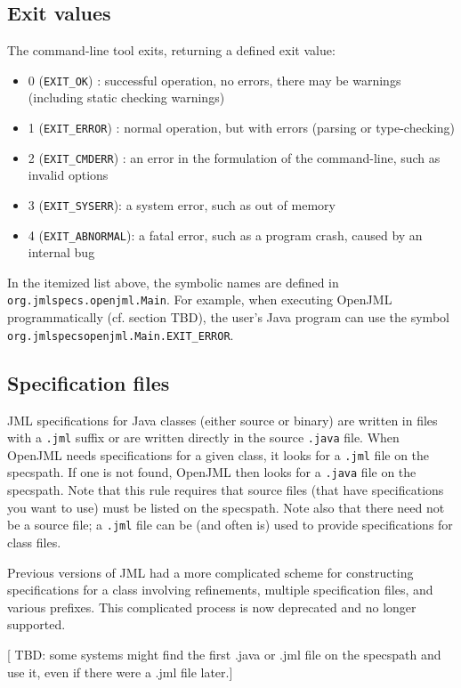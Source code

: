 \documentclass{report}%
\begin{document}
\subsection{Exit values}
The command-line tool exits, returning a defined exit value:
\begin{itemize}
\item 0 ({\tt EXIT\_OK}) : successful operation, no errors, there may be warnings (including static checking warnings)
\item 1 ({\tt EXIT\_ERROR}) : normal operation, but with errors (parsing or type-checking)
\item 2 ({\tt EXIT\_CMDERR}) : an error in the formulation of the command-line, such as invalid options
\item 3 ({\tt EXIT\_SYSERR}): a system error, such as out of memory
\item 4 ({\tt EXIT\_ABNORMAL}): a fatal error, such as a program crash, caused by an internal bug
\end{itemize}
In the itemized list above, the symbolic names are defined in {\tt org.jmlspecs.openjml.Main}. For example, when executing OpenJML programmatically (cf. section TBD), the user's Java program can use the 
symbol {\tt org.jmlspecsopenjml.Main.EXIT\_ERROR}.

\subsection{Specification files}
\label{SpecFiles}

JML specifications for Java classes (either source or binary) are written in files with a {\tt .jml} suffix or are written directly in the source {\tt .java} file.
When OpenJML needs specifications for a given class, it looks for a {\tt .jml} file on the specspath. If one is not found, OpenJML then looks for a {\tt .java}
file on the specspath. Note that this rule requires that source files (that have specifications you want to use) must be listed on the specspath. Note also that there 
need not be a source file; a {\tt .jml} file can be (and often is) used to provide specifications for class files.

Previous versions of JML had a more complicated scheme for constructing specifications for a class involving refinements, multiple specification files, and various prefixes. This complicated process is now deprecated and no longer supported.

[ TBD: some systems might find the first .java or .jml file on the specspath and use it, even if there were a .jml file later.]
\end{document}
